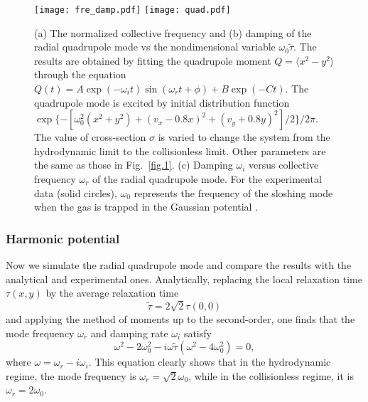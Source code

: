 \begin{figure}[t]
	\center
	\texttt{[image: fre\_damp.pdf]}
	\hskip 0.5cm
	\texttt{[image: quad.pdf]} 
	\caption[(a) The normalized collective frequency and (b) damping of the radial quadrupole mode vs the nondimensional variable $\omega_0\widetilde{\tau}$. (c) Damping $\omega_i$ versus collective frequency $\omega_r$ of the radial quadrupole mode. ]{ (a) The normalized collective frequency and (b) damping of the radial quadrupole mode vs the nondimensional variable $\omega_0\widetilde{\tau}$. The results are obtained by fitting the quadrupole moment $Q=\langle x^2-y^2\rangle$ through the equation $Q(t)=A\exp(-\omega_i t)\sin(\omega_rt+\phi)+B\exp(-Ct)$. The quadrupole mode is excited by initial distribution function $\exp\{-[\omega_0^2(x^2+y^2)+(v_x-0.8x)^2+(v_y+0.8y)^2]/2\}/2\pi$. The value of cross-section $\sigma$ is varied to change the system from the hydrodynamic limit to the collisionless limit. Other parameters are the same as those in Fig.~\ref{fig.1}. (c) Damping $\omega_i$ versus collective frequency $\omega_r$ of the radial quadrupole mode. For the experimental data (solid circles), $\omega_0$ represents the frequency of the sloshing mode when the gas is trapped in the Gaussian potential \cite{Riedl2008}.}
	\label{fig.2}
\end{figure}


\subsubsection{Harmonic potential}

Now we simulate the radial quadrupole mode and compare the results with the analytical and experimental ones. Analytically, replacing the local relaxation time $\tau(x,y)$ by the average relaxation time
\begin{equation}
\widetilde{\tau}=2\sqrt{2}\tau(0,0)
\end{equation} 
and applying the method of moments up to the second-order, one finds that the mode frequency $\omega_r$ and damping rate $\omega_i$ satisfy~\cite{AlKhawaja2000, Buggle2005}
\begin{equation}\label{quad}
\omega^2-2\omega_0^2
-i\omega\widetilde{\tau}(\omega^2-4\omega_0^2)=0,
\end{equation}
where $\omega=\omega_r-i\omega_i$. This equation clearly shows that in the hydrodynamic regime, the mode frequency is $\omega_r=\sqrt{2}\omega_0$, while in the collisionless regime, it is $\omega_r=2\omega_0$.


